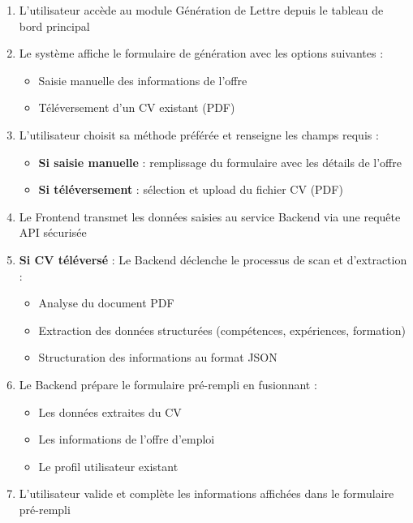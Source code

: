\begin{enumerate}
    \item L'utilisateur accède au module \og Génération de Lettre \fg{} depuis le tableau de bord principal
    
    \item Le système affiche le formulaire de génération avec les options suivantes :
    \begin{itemize}
        \item Saisie manuelle des informations de l'offre
        \item Téléversement d'un CV existant (PDF)
    \end{itemize}
    
    \item L'utilisateur choisit sa méthode préférée et renseigne les champs requis :
    \begin{itemize}
        \item \textbf{Si saisie manuelle} : remplissage du formulaire avec les détails de l'offre
        \item \textbf{Si téléversement} : sélection et upload du fichier CV (PDF)
    \end{itemize}
    
    \item Le Frontend transmet les données saisies au service Backend via une requête API sécurisée
    
    \item \textbf{Si CV téléversé} : Le Backend déclenche le processus de scan et d'extraction :
    \begin{itemize}
        \item Analyse du document PDF
        \item Extraction des données structurées (compétences, expériences, formation)
        \item Structuration des informations au format JSON
    \end{itemize}
    
    \item Le Backend prépare le formulaire pré-rempli en fusionnant :
    \begin{itemize}
        \item Les données extraites du CV
        \item Les informations de l'offre d'emploi
        \item Le profil utilisateur existant
    \end{itemize}
    
    \item L'utilisateur valide et complète les informations affichées dans le formulaire pré-rempli
    

\end{enumerate}
